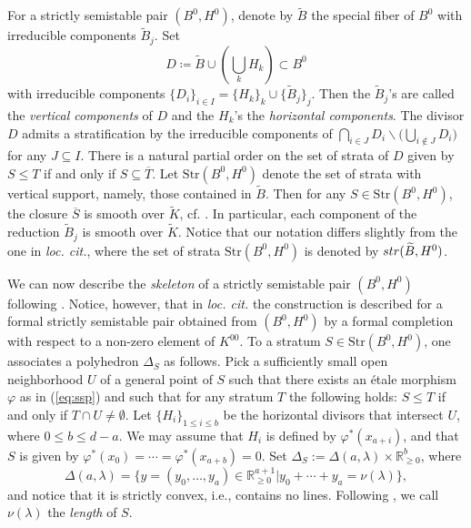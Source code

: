 \documentclass[11pt,reqno]{amsart}
\numberwithin{equation}{section}
\theoremstyle{definition}
\theoremstyle{remark}
\begin{document}

For a strictly semistable pair $(B^0,H^0)$, denote by $\widetilde B$ the special fiber of $B^0$ with irreducible components $\widetilde B_j$. Set 
\begin{equation}\label{eq:divisor}
    D\coloneqq\widetilde B\cup\left(\bigcup_k H_k\right) \subset B^0 
\end{equation}
with irreducible components $\{D_i\}_{i \in I} = \{H_k\}_k \cup \{\widetilde B_j\}_j$. Then the $\widetilde B_j$'s are called the \emph{vertical components} of $D$ and the $H_k$'s the \emph{horizontal components}. The divisor $D$ admits a stratification by the irreducible components of $\bigcap_{i\in J}D_i\backslash\big(\bigcup_{i\not\in J}D_i\big)$ for any $J\subseteq I$. There is a natural partial order on the set of strata of $D$ given by $S\leq T$ if and only if $S\subseteq\overline T$. Let $\mathrm{Str}(B^0,H^0)$ denote the set of strata with vertical support, namely, those contained in $\widetilde B$. Then for any $S\in\mathrm{Str}(B^0,H^0)$, the closure $\overline S$ is smooth over $\widetilde K$, cf. \cite[\S 3.15]{GRW16}. In particular, each component of the reduction $\widetilde B_j$ is smooth over $\widetilde K$. Notice that our notation differs slightly from the one in {\em loc. cit.}, where the set of strata $\mathrm{Str}(B^0,H^0)$ is denoted by ${\rm str}(\widetilde B, H^0)$. 

We can now describe the {\em skeleton} of a strictly semistable pair $(B^0,H^0)$ following \cite[\S 4]{GRW16}. Notice, however, that in {\em loc. cit.} the construction is described for a formal strictly semistable pair obtained from $(B^0,H^0)$ by a formal completion with respect to a non-zero element of $K^{00}$. To a stratum $S\in \mathrm{Str}(B^0,H^0)$, one associates a polyhedron $\Delta_S$ as follows. Pick a sufficiently small open neighborhood $U$ of a general point of $S$ such that there exists an \'etale morphism $\varphi$ as in (\ref{eq:ssp}) and such that for any stratum $T$ the following holds: $S\le T$ if and only if $T\cap U\ne\emptyset$. Let $\{H_i\}_{1\leq i\leq b}$ be the horizontal divisors that intersect $U$, where $0\leq b\leq d-a$. We may assume that $H_i$ is defined by $\varphi^*(x_{a+i})$, and that $S$ is given by $\varphi^*(x_0)=\cdots=\varphi^*(x_{a+b})=0$. Set $\Delta_S:=\Delta(a,\lambda)\times \mathbb R^b_{\geq 0}$, where 
$$\Delta(a,\lambda)=\{y=(y_0,\dotsc,y_a)\in\mathbb R_{\geq 0}^{a+1}|y_0+\cdots +y_a=\nu(\lambda)\},$$
and notice that it is strictly convex, i.e., contains no lines. Following \cite{GRW16}, we call $\nu(\lambda)$ the {\em length} of $S$. 
\end{document}
